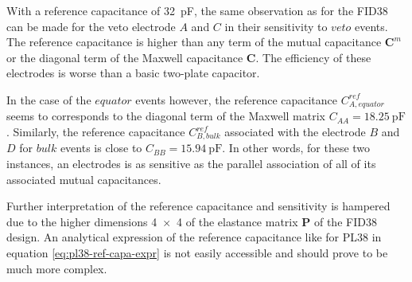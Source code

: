 With a reference capacitance of \SI{32}{\pico\farad}, the same observation as for the FID38 can be made for the veto electrode $A$ and $C$ in their sensitivity to $veto$ events. The reference capacitance is higher than any term of the mutual capacitance $\bm{C}^m$ or the diagonal term of the Maxwell capacitance $\bm{C}$. The efficiency of these electrodes is worse than a basic two-plate capacitor.

In the case of the $equator$ events however, the reference capacitance $C_{A, equator}^{ref}$ seems to corresponds to the diagonal term of the Maxwell matrix $C_{AA}=\SI{18.25}{\pico\farad}$. Similarly, the reference capacitance $C_{B, bulk}^{ref}$ associated with the electrode $B$ and $D$ for $bulk$ events is close to $C_{BB} = \SI{15.94}{\pico\farad}$. In other words, for these two instances, an electrodes is as sensitive as the parallel association  of all of its associated mutual capacitances.

Further interpretation of the reference capacitance and sensitivity is hampered due to the higher dimensions \num{4 x 4} of the elastance matrix $\bm{P}$ of the FID38 design. An analytical expression of the reference capacitance like for PL38 in equation \ref{eq:pl38-ref-capa-expr} is not easily accessible and should prove to be much more complex.



